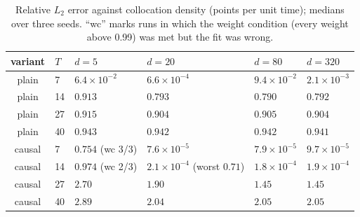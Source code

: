 \documentclass[11pt,a4paper]{article}
\begin{document}
\begin{table}[tbp]
  \centering
  \caption{Relative $L_2$ error against collocation density (points per
  unit time); medians over three seeds. ``wc'' marks runs in which the
  weight condition (every weight above 0.99) was met but the fit was
  wrong.}
  \label{tab:density}
  \small
  \begin{tabular}{clllll}
    \toprule
    variant & $T$ & $d = 5$ & $d = 20$ & $d = 80$ & $d = 320$ \\
    \midrule
    plain  & 7  & $6.4\times10^{-2}$ & $6.6\times10^{-4}$ & $9.4\times10^{-2}$ & $2.1\times10^{-3}$ \\
    plain  & 14 & $0.913$ & $0.793$ & $0.790$ & $0.792$ \\
    plain  & 27 & $0.915$ & $0.904$ & $0.905$ & $0.904$ \\
    plain  & 40 & $0.943$ & $0.942$ & $0.942$ & $0.941$ \\
    \addlinespace
    causal & 7  & $0.754$ (wc 3/3) & $7.6\times10^{-5}$ & $7.9\times10^{-5}$ & $9.7\times10^{-5}$ \\
    causal & 14 & $0.974$ (wc 2/3) & $2.1\times10^{-4}$ (worst $0.71$) & $1.8\times10^{-4}$ & $1.9\times10^{-4}$ \\
    causal & 27 & $2.70$ & $1.90$ & $1.45$ & $1.45$ \\
    causal & 40 & $2.89$ & $2.04$ & $2.05$ & $2.05$ \\
    \bottomrule
  \end{tabular}
\end{table}
\end{document}
